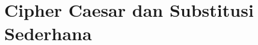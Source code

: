 \documentclass[../buku_kriptografi.tex]{subfiles}
\begin{document}
\ifdefined\InMainDocument\else\setcounter{chapter}{4}\fi

\chapter{Cipher Caesar dan Substitusi Sederhana}






\ifdefined\InMainDocument\else


\fi
\end{document}
